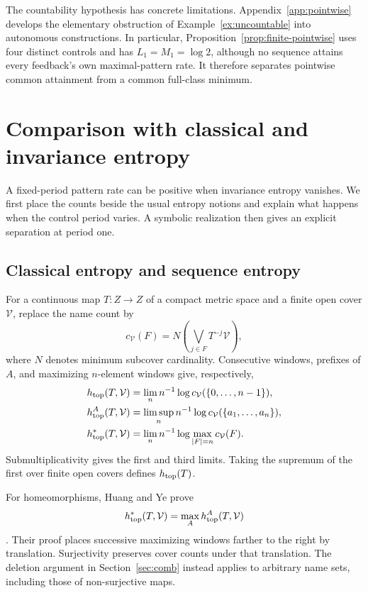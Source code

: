 \documentclass[11pt,reqno]{amsart}
\numberwithin{equation}{section}
\theoremstyle{definition}
\theoremstyle{definition}
\begin{document}
The countability hypothesis has concrete limitations.
Appendix~\ref{app:pointwise} develops the elementary obstruction
of Example~\ref{ex:uncountable} into autonomous constructions.
In particular, Proposition~\ref{prop:finite-pointwise}
uses four distinct controls and has $L_1=M_1=\log2$, although no
sequence attains every feedback's own maximal-pattern rate. It therefore
separates pointwise common attainment from a common full-class minimum.


\section{Comparison with classical and invariance entropy}\label{sec:comparison}

A fixed-period pattern rate can be positive when invariance entropy
vanishes. We first place the counts beside the usual entropy notions
and explain what happens when the control period varies. A symbolic
realization then gives an explicit separation at period one.

\subsection{Classical entropy and sequence entropy}\label{sec:background}
For a continuous map $T:Z\to Z$ of a compact metric space and a
finite open cover $\mathcal V$, replace the name count by
\[
 c_{\mathcal V}(F)=N\left(\bigvee_{j\in F}T^{-j}\mathcal V\right),
\]
where $N$ denotes minimum subcover cardinality. Consecutive windows,
prefixes of $A$, and maximizing $n$-element windows give, respectively,
\begin{align*}
 h_{\rm top}(T,\mathcal V)
   &=\lim_n n^{-1}\log c_{\mathcal V}(\{0,\ldots,n-1\}),\\
 h_{\rm top}^A(T,\mathcal V)
   &=\limsup_n n^{-1}\log c_{\mathcal V}(\{a_1,\ldots,a_n\}),\\
 h_{\rm top}^*(T,\mathcal V)
   &=\lim_n n^{-1}\log\max_{|F|=n}c_{\mathcal V}(F).
\end{align*}
Submultiplicativity gives the first and third limits. Taking the
supremum of the first over finite open covers defines
$h_{\rm top}(T)$.

For homeomorphisms, Huang and Ye prove
\begin{equation}\label{eq:HY-background}
 h_{\rm top}^*(T,\mathcal V)
   =\max_A h_{\rm top}^A(T,\mathcal V)
\end{equation}
\cite[Theorem~2.1(1)]{HuangYe2009}. Their proof places successive
maximizing windows farther to the right by translation. Surjectivity
preserves cover counts under that translation. The deletion argument
in Section~\ref{sec:comb} instead applies to arbitrary name sets,
including those of non-surjective maps.
\end{document}

